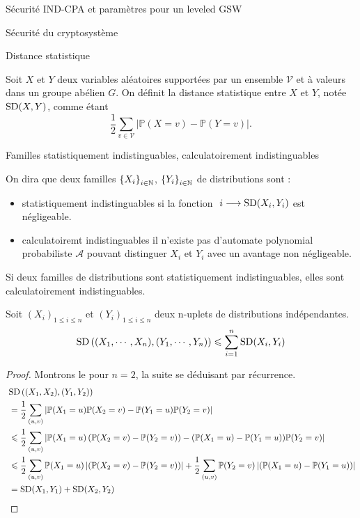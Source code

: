 \begin{section}{Sécurité IND-CPA et paramètres pour un leveled GSW}
	\begin{subsection}{Sécurité du cryptosystème}

	\begin{definition}{Distance statistique}

	Soit $X$ et $Y$ deux variables aléatoires supportées par
	un ensemble $\mathcal{V}$ et à valeurs 
	dans un groupe abélien $G$. On définit la distance 
	statistique entre $X$ et $Y$, notée $\text{SD}(X,Y)$, 
	comme étant
	\[ \frac{1}{2} \sum_{v \in \mathcal{V}} |\mathbb{P}(X = v) -
	\mathbb{P}(Y = v)|. \]

	\end{definition}

	\begin{definition}{Familles statistiquement indistinguables, calculatoirement indistinguables}

	On dira que deux familles ${\{X_i\}}_{i \in \mathbb{N}}$, ${\{Y_i\}}_{i \in \mathbb{N}}$
	de distributions sont :
	\begin{itemize}
	\item statistiquement indistinguables si la fonction $ i \longrightarrow \SD(X_i, Y_i) $ est négligeable.
	\item calculatoiremt indistinguables il n'existe pas d'automate polynomial probabiliste $\mathcal{A}$
	pouvant distinguer $X_i$ et $Y_i$ avec un avantage non négligeable.
	\end{itemize}
	\end{definition}
	\begin{prop}
	Si deux familles de distributions sont statistiquement
	indistinguables, elles sont calculatoirement indistinguables.
	\end{prop} 

	\begin{prop} \label{sd_add}
	Soit ${(X_i)}_{1\leqslant i \leqslant n}$ et ${(Y_i)}_{1\leqslant i\leqslant n}$
	deux n-uplets de distributions indépendantes.
	\[ \text{SD}\left((X_1,\cdots,X_n), (Y_1, \cdots, Y_n)\right) \leqslant \sum_{i=1}^n \text{SD}(X_i,Y_i) \]
	\end{prop}
	\begin{proof}
	Montrons le pour $n = 2$, la suite se déduisant par récurrence.
	\begin{align*}
		&\SD\left((X_1,X_2),(Y_1,Y_2)\right) \\
		&= \frac{1}{2} \sum_{(u,v)}\left| \PP(X_1=u)\PP(X_2=v) -
		\PP(Y_1=u)\PP(Y_2=v) \right| \\ 
		&\leqslant
		\frac{1}{2} \sum_{(u,v)}\left| \PP(X_1=u)\left(\PP(X_2=v) - \PP(Y_2 = v)\right)
		- (\PP(X_1 = u) - \PP(Y_1=u))\PP(Y_2=v) \right| \\
		&\leqslant
		\frac{1}{2} \sum_{(u,v)} \PP(X_1 = u)
		\left|\left(\PP(X_2=v) - \PP(Y_2 = v)\right) \right| + 
		\frac{1}{2} \sum_{(u,v)}\PP(Y_2=v)\left|(\PP(X_1 = u) - \PP(Y_1=u)) \right| \\
		&= \SD(X_1, Y_1) + \SD(X_2, Y_2)
	\end{align*}
	\end{proof}


\end{subsection}
\end{section}

